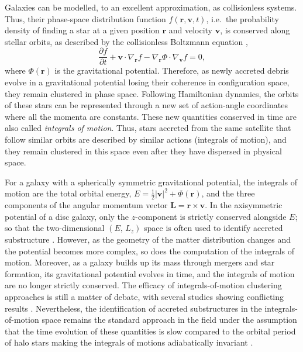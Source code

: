 Galaxies can be modelled, to an excellent approximation, as collisionless systems.
Thus, their phase-space distribution function $f(\mathbf{r},\mathbf{v},t)$, i.e.\ the probability density of finding
a star at a given position $\mathbf{r}$ and velocity $\mathbf{v}$, is conserved along stellar orbits, as described by the collisionless
Boltzmann equation \citep{Binney2008},
\begin{equation}
    \frac{\partial f}{\partial t}
    + \mathbf{v} \cdot \nabla_{\mathbf{r}} f
    - \nabla_{\mathbf{r}}\Phi \cdot \nabla_{\mathbf{v}} f = 0,
\label{eq:cbe}
\end{equation}
where $\Phi(\mathbf{r})$ is the gravitational potential.
Therefore, as newly accreted debris evolve in a gravitational potential
losing their coherence in configuration space, they remain clustered in phase space. Following Hamiltonian dynamics, the
orbits of these stars can be represented through a new set of action-angle coordinates
where all the momenta are constants. These new quantities conserved in time are also called \textit{integrals of motion}.
Thus, stars accreted from the same satellite that follow similar orbits are described by similar actions (integrals of motion),
and they remain clustered in this space even after they have dispersed in physical space.

For a galaxy with a spherically symmetric gravitational potential, the integrals of motion are the total orbital energy,
$E = \tfrac{1}{2}|\mathbf{v}|^2 + \Phi(\mathbf{r})$,
and the three components of the angular momentum vector $\mathbf{L} = \mathbf{r}\times\mathbf{v}$.
In the axisymmetric potential of a disc galaxy, only the $z$-component
is strictly conserved alongside $E$; so that the two-dimensional $(E,\,L_z)$ space is often used to identify 
accreted substructure \citep{Helmi1999a,Koppelman2018,Myeong2019,Lovdal2022,Ou2023,Dodd2023}.
However, as the geometry of the matter distribution changes and the potential becomes more complex,
so does the computation of the integrals of motion. Moreover, as a galaxy builds up its mass through mergers and star formation,
its gravitational potential evolves in time, and the integrals of motion are no longer strictly conserved.
The efficacy of integrals-of-motion clustering approaches is still a matter of debate, with several
studies showing conflicting results \citep{JeanBaptiste2017,Mori2024}. Nevertheless, the identification of accreted substructures
in the integrals-of-motion space remains the standard approach in the field under the assumption that the time evolution of these quantities
is slow compared to the orbital period of halo stars making the integrals of motions adiabatically invariant \citep{Binney2008}.

